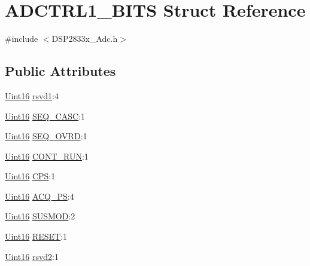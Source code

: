 \hypertarget{struct_a_d_c_t_r_l1___b_i_t_s}{}\section{A\+D\+C\+T\+R\+L1\+\_\+\+B\+I\+T\+S Struct Reference}
\label{struct_a_d_c_t_r_l1___b_i_t_s}


{\ttfamily \#include $<$D\+S\+P2833x\+\_\+\+Adc.\+h$>$}

\subsection*{Public Attributes}
\begin{DoxyCompactItemize}
\item 
\hyperlink{_d_s_p2833x___device_8h_a59a9f6be4562c327cbfb4f7e8e18f08b}{Uint16} \hyperlink{struct_a_d_c_t_r_l1___b_i_t_s_a467adefe1a9981344286914cfd1ae8c7}{rsvd1}\+:4
\item 
\hyperlink{_d_s_p2833x___device_8h_a59a9f6be4562c327cbfb4f7e8e18f08b}{Uint16} \hyperlink{struct_a_d_c_t_r_l1___b_i_t_s_a559e481021c756b32a767f3bf9bf0577}{S\+E\+Q\+\_\+\+C\+A\+S\+C}\+:1
\item 
\hyperlink{_d_s_p2833x___device_8h_a59a9f6be4562c327cbfb4f7e8e18f08b}{Uint16} \hyperlink{struct_a_d_c_t_r_l1___b_i_t_s_af7e4f1096e6f9c00cd3c924b63c7dea9}{S\+E\+Q\+\_\+\+O\+V\+R\+D}\+:1
\item 
\hyperlink{_d_s_p2833x___device_8h_a59a9f6be4562c327cbfb4f7e8e18f08b}{Uint16} \hyperlink{struct_a_d_c_t_r_l1___b_i_t_s_a875f99be7ce440ebfa03f36862f60452}{C\+O\+N\+T\+\_\+\+R\+U\+N}\+:1
\item 
\hyperlink{_d_s_p2833x___device_8h_a59a9f6be4562c327cbfb4f7e8e18f08b}{Uint16} \hyperlink{struct_a_d_c_t_r_l1___b_i_t_s_a17c2ac45866e00fd98f5997149627c1e}{C\+P\+S}\+:1
\item 
\hyperlink{_d_s_p2833x___device_8h_a59a9f6be4562c327cbfb4f7e8e18f08b}{Uint16} \hyperlink{struct_a_d_c_t_r_l1___b_i_t_s_ac5a7aa6e96fb9e7623a46c8442ab134a}{A\+C\+Q\+\_\+\+P\+S}\+:4
\item 
\hyperlink{_d_s_p2833x___device_8h_a59a9f6be4562c327cbfb4f7e8e18f08b}{Uint16} \hyperlink{struct_a_d_c_t_r_l1___b_i_t_s_a5504e1601d17c97df6417aa3d02e6068}{S\+U\+S\+M\+O\+D}\+:2
\item 
\hyperlink{_d_s_p2833x___device_8h_a59a9f6be4562c327cbfb4f7e8e18f08b}{Uint16} \hyperlink{struct_a_d_c_t_r_l1___b_i_t_s_a3b3b1dc56e64f913b8937b6a60469d74}{R\+E\+S\+E\+T}\+:1
\item 
\hyperlink{_d_s_p2833x___device_8h_a59a9f6be4562c327cbfb4f7e8e18f08b}{Uint16} \hyperlink{struct_a_d_c_t_r_l1___b_i_t_s_a22cac8be9ab9a7f20e8609d4d9dc207b}{rsvd2}\+:1
\end{DoxyCompactItemize}


